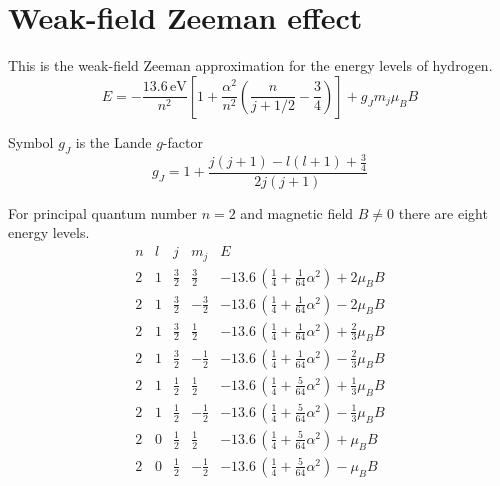 

\section*{Weak-field Zeeman effect}

This is the weak-field Zeeman approximation for the energy levels of hydrogen.
\begin{equation*}
E=-\frac{13.6\,\text{eV}}{n^2}
\left[
1+\frac{\alpha^2}{n^2}\left(\frac{n}{j+1/2}-\frac{3}{4}\right)
\right]+g_Jm_j\mu_BB
\end{equation*}

Symbol $g_J$ is the Lande $g$-factor
\begin{equation*}
g_J=1+\frac{j(j+1)-l(l+1)+\frac{3}{4}}{2j(j+1)}
\end{equation*}

For principal quantum number $n=2$ and magnetic field $B\ne0$ there are eight energy levels.
\begin{equation*}
\begin{matrix}
n & l & j & m_j & E
\\[2ex]
2 & 1 & \frac{3}{2} & \frac{3}{2} &
-13.6\,\left(\tfrac{1}{4}+\tfrac{1}{64}\alpha^2\right)+2\mu_BB
\\[1ex]
2 & 1 & \frac{3}{2} & -\frac{3}{2} &
-13.6\,\left(\tfrac{1}{4}+\tfrac{1}{64}\alpha^2\right)-2\mu_BB
\\[2ex]
2 & 1 & \frac{3}{2} & \frac{1}{2} &
-13.6\,\left(\tfrac{1}{4}+\tfrac{1}{64}\alpha^2\right)+\frac{2}{3}\mu_BB
\\[1ex]
2 & 1 & \frac{3}{2} & -\frac{1}{2} &
-13.6\,\left(\tfrac{1}{4}+\tfrac{1}{64}\alpha^2\right)-\frac{2}{3}\mu_BB
\\[2ex]
2 & 1 & \frac{1}{2} & \frac{1}{2} &
-13.6\,\left(\tfrac{1}{4}+\tfrac{5}{64}\alpha^2\right)+\frac{1}{3}\mu_BB
\\[1ex]
2 & 1 & \frac{1}{2} & -\frac{1}{2} &
-13.6\,\left(\tfrac{1}{4}+\tfrac{5}{64}\alpha^2\right)-\frac{1}{3}\mu_BB
\\[2ex]
2 & 0 & \frac{1}{2} & \frac{1}{2} &
-13.6\,\left(\tfrac{1}{4}+\tfrac{5}{64}\alpha^2\right)+\mu_BB
\\[1ex]
2 & 0 & \frac{1}{2} & -\frac{1}{2} &
-13.6\,\left(\tfrac{1}{4}+\tfrac{5}{64}\alpha^2\right)-\mu_BB
\end{matrix}
\end{equation*}


